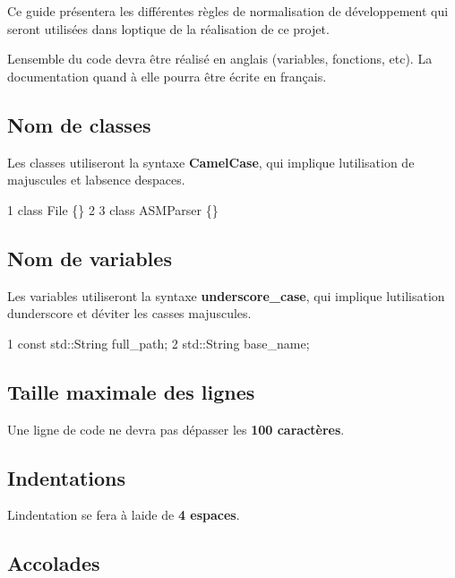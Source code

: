 Ce guide présentera les différentes règles de normalisation de développement qui seront utilisées dans l\textquotesingle{}optique de la réalisation de ce projet.

L\textquotesingle{}ensemble du code devra être réalisé en anglais (variables, fonctions, etc). La documentation quand à elle pourra être écrite en français.

\subsection*{Nom de classes}

Les classes utiliseront la syntaxe {\bfseries Camel\+Case}, qui implique l\textquotesingle{}utilisation de majuscules et l\textquotesingle{}absence d\textquotesingle{}espaces.


\begin{DoxyCode}
1 class File \{\}
2 
3 class ASMParser \{\}
\end{DoxyCode}


\subsection*{Nom de variables}

Les variables utiliseront la syntaxe {\bfseries underscore\+\_\+case}, qui implique l\textquotesingle{}utilisation d\textquotesingle{}underscore et d\textquotesingle{}éviter les casses majuscules.


\begin{DoxyCode}
1 const std::String full\_path;
2 std::String base\_name;
\end{DoxyCode}


\subsection*{Taille maximale des lignes}

Une ligne de code ne devra pas dépasser les {\bfseries 100 caractères}.

\subsection*{Indentations}

L\textquotesingle{}indentation se fera à l\textquotesingle{}aide de {\bfseries 4 espaces}.

\subsection*{Accolades}

